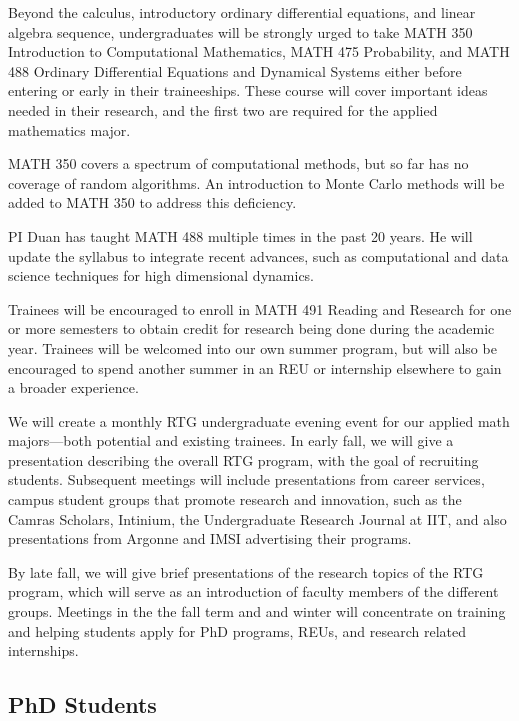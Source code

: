 \documentclass[11pt]{NSFamsart}
\begin{document}
Beyond the calculus, introductory ordinary differential equations, and linear algebra sequence, undergraduates will be strongly urged to take MATH 350 Introduction to Computational Mathematics, MATH 475 Probability, and MATH 488 Ordinary Differential Equations and Dynamical Systems either before entering or early in their traineeships.  These course will cover important ideas needed in their research, and the first two are required for the applied mathematics major.  

MATH 350 covers a spectrum of computational methods, but so far has no coverage of random algorithms. An introduction to Monte Carlo methods will be added to MATH 350 to address this deficiency.

PI Duan has taught MATH 488 multiple  times in the past 20 years.  He will update the syllabus to integrate recent advances, such as computational and data science techniques for high dimensional dynamics. 

Trainees will be encouraged to enroll in MATH 491 Reading and Research for one or more semesters to obtain credit for research being done during the academic year.  Trainees will be welcomed into our own summer program, but will also be encouraged to spend another summer in an REU or internship elsewhere to gain a broader experience.

We will create a monthly RTG undergraduate evening event for our applied math majors---both potential and existing trainees.  In early fall, we will give a presentation describing the overall RTG program, with the goal of recruiting students. Subsequent meetings will include presentations from   career services, campus student groups that promote research and innovation, such as the Camras Scholars, Intinium, the Undergraduate Research Journal at IIT, and also presentations from Argonne and IMSI advertising their programs. 

By late fall, we will give brief presentations of the research topics of the RTG program, which will serve as an introduction of faculty members of the different
groups. Meetings in the the fall term and and winter will concentrate on training and helping students apply for PhD programs, REUs, and research related internships. 



\subsection*{PhD Students}

\end{document}
